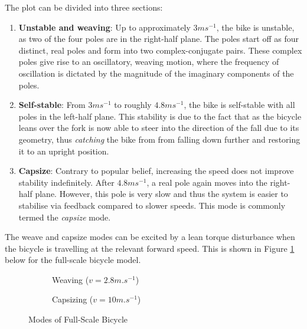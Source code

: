 The plot can be divided into three sections:

\begin{enumerate}
\item{\textbf{Unstable and weaving}: Up to approximately $3ms^{-1}$, the bike is unstable, as two of the four poles are in the right-half plane. The poles start off as four distinct, real poles and form into two complex-conjugate pairs. These complex poles give rise to an oscillatory, weaving motion, where the frequency of oscillation is dictated by the magnitude of the imaginary components of the poles.}
\item{\textbf{Self-stable}: From $3ms^{-1}$ to roughly $4.8ms^{-1}$, the bike is self-stable with all poles in the left-half plane. This stability is due to the fact that as the bicycle leans over the fork is now able to steer into the direction of the fall due to its geometry, thus \textit{catching} the bike from from falling down further and restoring it to an upright position.}
\item{\textbf{Capsize}: Contrary to popular belief, increasing the speed does not improve stability indefinitely. After $4.8ms^{-1}$, a real pole again moves into the right-half plane. However, this pole is very slow and thus the system is easier to stabilise via feedback compared to slower speeds. This mode is commonly termed the \textit{capsize} mode.}
\end{enumerate}

The weave and capsize modes can be excited by a lean torque disturbance when the bicycle is travelling at the relevant forward speed. This is shown in Figure \ref{fig:FSModes} below for the full-scale bicycle model.

\begin{figure}[H]
	\begin{subfigure}[t]{0.5\textwidth}
	\caption{Weaving ($v=2.8\si{m.s^{-1}}$)}
	\end{subfigure}
	\quad
	\begin{subfigure}[t]{0.5\textwidth}
	\caption{Capsizing ($v=10\si{m.s^{-1}}$)}
	\end{subfigure}
	\caption{Modes of Full-Scale Bicycle}
	\label{fig:FSModes}
\end{figure}

